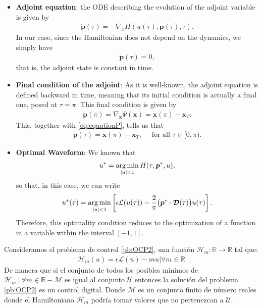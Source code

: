 \begin{itemize}
    \item[1.] \textbf{Adjoint equation}: the ODE describing the evolution of the adjoint variable is given by 
    \begin{align*}
    	\dot{\bm{p}}(\tau) = -\nabla_x H(u(\tau),\bm{p}(\tau),\tau).
    \end{align*}
    In our case, since the Hamiltonian does not depend on the dynamics, we simply have
    \begin{align}\label{eq:equationP}
    	\dot{\bm{p}}(\tau) = 0,
    \end{align}
	that is, the adjoint state is constant in time.
	
	\item[2.] \textbf{Final condition of the adjoint}: As it is well-known, the adjoint equation is defined backward in time, meaning that its initial condition is actually a final one, posed at $\tau=\pi$. This final condition is given by 
    \begin{align*}
    	\bm{p}(\pi) = \nabla_{\bm{x}} \Psi(\bm{x}) = \bm{x}(\pi) - \bm{x}_T.
    \end{align*} 
	This, together with \eqref{eq:equationP}, tells us that
	\begin{align*}
		\bm{p}(\tau) = \bm{x}(\pi) - \bm{x}_T, \quad \mbox{ for all }\tau\in [0,\pi).
	\end{align*} 
    
    \item[3.] \textbf{Optimal  Waveform}: We known that 
    \begin{align*}
    	u^* = \operatorname*{arg\,min}_{|u|<1} H(\tau,\bm{p}^*,u),
    \end{align*}
	so that, in this case, we can write
    \begin{gather}
        u^*(\tau) = \operatorname*{arg\,min}_{|u|<1}  \left[\epsilon \mathcal{L}(u(\tau)) - \frac 2\pi \big(\bm{p}^* \cdot \bm{\mathcal{D}}(\tau)\big) u(\tau) \right].
    \end{gather}
    Therefore, this optimality condition reduces to the optimization of a function in a variable within the interval $ [- 1,1] $. 
\end{itemize}
\begin{proposition}
    Consideramos el problema de control \ref{pb:OCP2}, una función $\mathcal{H}_m:\mathbb{R}\rightarrow \mathbb{R}$ tal que:
    \begin{gather}\label{Hm}
        \mathcal{H}_m(u) = \epsilon \mathcal{L}(u) - mu  |  \forall m \in \mathbb{R}
    \end{gather}
    De manera que si el conjunto de todos los posibles mínimos de $\mathcal{H}_m \ | \ \forall m \in \mathbb{R} - \mathcal{M}$  es igual al conjunto $\mathcal{U}$ entonces la solución del problema \ref{pb:OCP2} es un control digital. Donde $\mathcal{M}$ es un conjunto finito de número reales donde el Hamiltoniano $\mathcal{H}_m$ podría tomar valores que no pertenezcan a $\mathcal{U}$.
\end{proposition}

